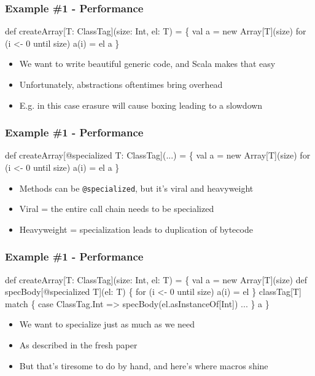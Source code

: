 \documentclass[svgnames,hyperref={bookmarks=false}]{beamer}
\begin{document}
\begin{frame}[fragile]
\frametitle{Example \#1 - Performance}

\begin{semiverbatim}
def createArray[T: ClassTag](size: Int, el: T) = \{
  val a = new Array[T](size)
  for (i <- 0 until size) a(i) = el
  a
\}

\end{semiverbatim}

\begin{itemize}
\item We want to write beautiful generic code, and Scala makes that easy
\item Unfortunately, abstractions oftentimes bring overhead
\item E.g. in this case erasure will cause boxing leading to a slowdown
\end{itemize}
\end{frame}

\begin{frame}[fragile]
\frametitle{Example \#1 - Performance}

\begin{semiverbatim}
def createArray[@specialized T: ClassTag](...) = \{
  val a = new Array[T](size)
  for (i <- 0 until size) a(i) = el
  a
\}

\end{semiverbatim}

\begin{itemize}
\item Methods can be \texttt{@specialized}, but it's viral and heavyweight
\item Viral = the entire call chain needs to be specialized
\item Heavyweight = specialization leads to duplication of bytecode
\end{itemize}
\end{frame}

\begin{frame}[fragile]
\frametitle{Example \#1 - Performance}

\begin{semiverbatim}
def createArray[T: ClassTag](size: Int, el: T) = \{
  val a = new Array[T](size)
  \alert{def specBody[@specialized T](el: T) \{}
    \alert{for (i <- 0 until size) a(i) = el}
  \alert{\}}
  \alert{classTag[T] match \{}
    \alert{case ClassTag.Int => specBody(el.asInstanceOf[Int])}
    \alert{...}
  \alert{\}}
  a
\}

\end{semiverbatim}

\begin{itemize}
\item We want to specialize just as much as we need
\item As described in the fresh  paper
\item But that's tiresome to do by hand, and here's where macros shine
\end{itemize}
\end{frame}
\end{document}
